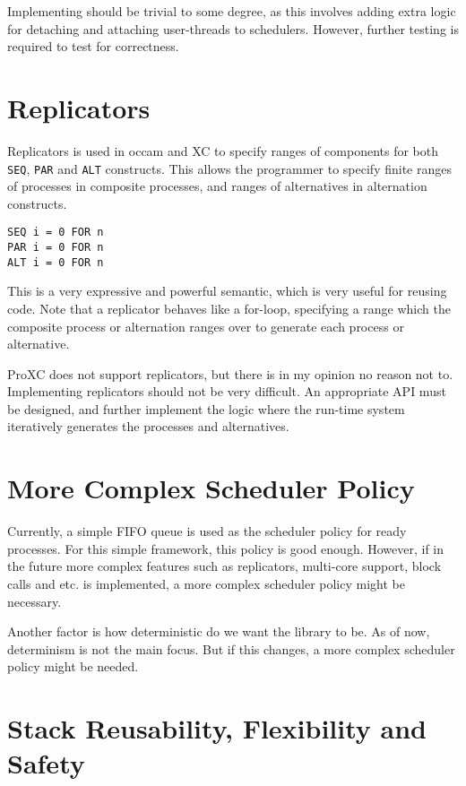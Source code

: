 Implementing should be trivial to some degree, as this involves adding extra logic for detaching and attaching user\hyp{}threads to schedulers. However, further testing is required to test for correctness.

\section{Replicators}

Replicators is used in occam and XC to specify ranges of components for both \texttt{SEQ}, \texttt{PAR} and \texttt{ALT} constructs. This allows the programmer to specify finite ranges of processes in composite processes, and ranges of alternatives in alternation constructs. 

\begin{lstlisting}[style={CustomC},frame={},numbers={none}]
SEQ i = 0 FOR n
PAR i = 0 FOR n
ALT i = 0 FOR n
\end{lstlisting}

This is a very expressive and powerful semantic, which is very useful for reusing code. Note that a replicator behaves like a for\hyp{}loop, specifying a range which the composite process or alternation ranges over to generate each process or alternative. 

ProXC does not support replicators, but there is in my opinion no reason not to. Implementing replicators should not be very difficult. An appropriate API must be designed, and further implement the logic where the run\hyp{}time system iteratively generates the processes and alternatives.

\section{More Complex Scheduler Policy}

Currently, a simple FIFO queue is used as the scheduler policy for ready processes. For this simple framework, this policy is good enough. However, if in the future more complex features such as replicators, multi\hyp{}core support, block calls and etc. is implemented, a more complex scheduler policy might be necessary. 

Another factor is how deterministic do we want the library to be. As of now, determinism is not the main focus. But if this changes, a more complex scheduler policy might be needed. 

\section{Stack Reusability, Flexibility and Safety}

